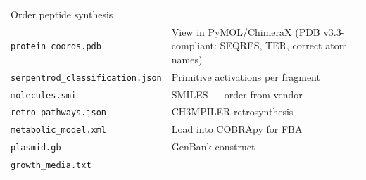 \documentclass[12pt,a4paper]{article}
\begin{document}
\begin{longtable}[]{@{}ll@{}}
\begin{minipage}[t]{0.54\columnwidth}
Order peptide synthesis\strut
\end{minipage}\tabularnewline
\begin{minipage}[t]{0.40\columnwidth}\raggedright
\texttt{protein\_coords.pdb}\strut
\end{minipage} & \begin{minipage}[t]{0.54\columnwidth}\raggedright
View in PyMOL/ChimeraX (PDB v3.3-compliant: SEQRES, TER, correct atom
names)\strut
\end{minipage}\tabularnewline
\begin{minipage}[t]{0.40\columnwidth}\raggedright
\texttt{serpentrod\_classification.json}\strut
\end{minipage} & \begin{minipage}[t]{0.54\columnwidth}\raggedright
Primitive activations per fragment\strut
\end{minipage}\tabularnewline
\begin{minipage}[t]{0.40\columnwidth}\raggedright
\texttt{molecules.smi}\strut
\end{minipage} & \begin{minipage}[t]{0.54\columnwidth}\raggedright
SMILES --- order from vendor\strut
\end{minipage}\tabularnewline
\begin{minipage}[t]{0.40\columnwidth}\raggedright
\texttt{retro\_pathways.json}\strut
\end{minipage} & \begin{minipage}[t]{0.54\columnwidth}\raggedright
CH3MPILER retrosynthesis\strut
\end{minipage}\tabularnewline
\begin{minipage}[t]{0.40\columnwidth}\raggedright
\texttt{metabolic\_model.xml}\strut
\end{minipage} & \begin{minipage}[t]{0.54\columnwidth}\raggedright
Load into COBRApy for FBA\strut
\end{minipage}\tabularnewline
\begin{minipage}[t]{0.40\columnwidth}\raggedright
\texttt{plasmid.gb}\strut
\end{minipage} & \begin{minipage}[t]{0.54\columnwidth}\raggedright
GenBank construct\strut
\end{minipage}\tabularnewline
\begin{minipage}[t]{0.40\columnwidth}\raggedright
\texttt{growth\_media.txt}\strut
\end{minipage} & \begin{minipage}[t]{0.54\columnwidth}\raggedright

\end{minipage}
\end{longtable}
\end{document}
